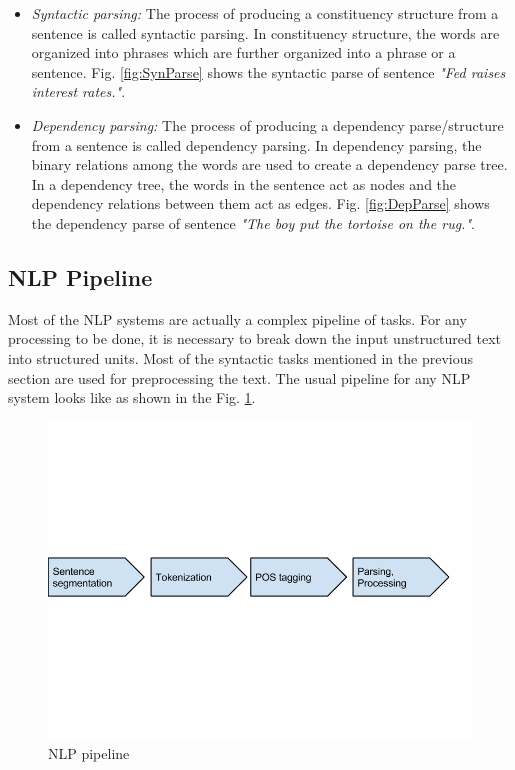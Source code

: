 \begin{itemize}

\item \textit{Syntactic parsing:} The process of producing a constituency structure from a sentence is called syntactic parsing. In constituency structure, the words are organized into phrases which are further organized into a phrase or a sentence. Fig. \ref{fig:SynParse} shows the syntactic parse of sentence \textit{"Fed raises interest rates."}.

\item \textit{Dependency parsing:} The process of producing a dependency parse/structure from a sentence is called dependency parsing. In dependency parsing, the binary relations among the words are used to create a dependency parse tree. In a dependency tree, the words in the sentence act as nodes and the dependency relations between them act as edges. Fig. \ref{fig:DepParse} shows the dependency parse of sentence \textit{"The boy put the tortoise on the rug."}.

\end{itemize}

\subsection{NLP Pipeline}

Most of the NLP systems are actually a complex pipeline of tasks. For any processing to be done, it is necessary to break down the input unstructured text into structured units. Most of the syntactic tasks mentioned in the previous section are used for preprocessing the text. The usual pipeline for any NLP system looks like as shown in the Fig. \ref{fig:NLPPipe}.

\begin{figure}
\centering
\includegraphics[scale=0.4]{figures/NLPPipeline.png}
\caption{NLP pipeline}\label{fig:NLPPipe}
\end{figure}

